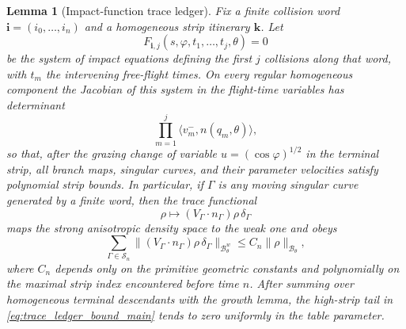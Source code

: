 \documentclass[12pt, letterpaper]{amsart}
\newcommand{\Bcal}{\mathcal{B}}
\providecommand{\Ssing}{\mathcal{S}}
\theoremstyle{plain}
\newtheorem{lemma}[theorem]{Lemma}
\theoremstyle{definition}
\theoremstyle{remark}
\begin{document}
\begin{lemma}[Impact-function trace ledger]
\label{lem:impact_trace_ledger_full}
Fix a finite collision word \(\mathbf i=(i_0,\ldots,i_n)\) and a homogeneous
strip itinerary \(\mathbf k\).  Let
\begin{equation}
    F_{\mathbf i,j}(s,\varphi,t_1,\ldots,t_j,\theta)=0
\end{equation}
be the system of impact equations defining the first \(j\) collisions along
that word, with \(t_m\) the intervening free-flight times.  On every regular
homogeneous component the Jacobian of this system in the flight-time variables
has determinant
\begin{equation}
\label{eq:impact_time_jacobian_product}
    \prod_{m=1}^{j}\langle v_m^-,n(q_m,\theta)\rangle,
\end{equation}
so that, after the grazing change of variable
\(u=(\cos\varphi)^{1/2}\) in the terminal strip, all branch maps, singular
curves, and their parameter velocities satisfy polynomial strip bounds.  In
particular, if \(\Gamma\) is any moving singular curve generated by a finite
word, then the trace functional
\begin{equation}
    \rho\longmapsto (V_\Gamma\cdot n_\Gamma)\rho\,\delta_{\Gamma}
\end{equation}
maps the strong anisotropic density space to the weak one and obeys
\begin{equation}
\label{eq:trace_ledger_bound_main}
    \sum_{\Gamma\in\Ssing_n}
    \|(V_\Gamma\cdot n_\Gamma)\rho\,\delta_{\Gamma}\|_{\Bcal^w_\theta}
    \le C_n\|\rho\|_{\Bcal_\theta},
\end{equation}
where \(C_n\) depends only on the primitive geometric constants and polynomially
on the maximal strip index encountered before time \(n\).  After summing over
homogeneous terminal descendants with the growth lemma, the high-strip tail in
\eqref{eq:trace_ledger_bound_main} tends to zero uniformly in the table
parameter.
\end{lemma}
\end{document}
